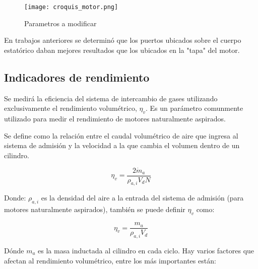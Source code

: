 
\begin{figure}
    \centering
    \texttt{[image: croquis\_motor.png]}
    \caption{Parametros a modificar}
    \label{fig:croquis_mrcvc}
\end{figure}

En trabajos anteriores \cite{chiquito} se determinó que los puertos ubicados
sobre el cuerpo estatórico daban mejores resultados que los ubicados en la
"tapa" del motor.

\subsection{Indicadores de rendimiento}
\label{sec:indicadores_rendimiento}

Se medirá la eficiencia del sistema de intercambio de gases utilizando
exclusivamente el rendimiento volumétrico, $\eta_v$.
%
Es un parámetro comunmente utilizado para medir el rendimiento de motores
naturalmente aspirados.

%
Se define como la relación entre el caudal volumétrico de aire que ingresa
al sistema de admisión y la velocidad a la que cambia el volumen dentro de un
cilindro.

\begin{equation}
  \label{eq:rendVol}
  \eta_v = \frac{2 \dot{m}_a}{\rho_{a,i} V_d N}
\end{equation}

Donde: $\rho_{a,i}$ es la densidad del aire a la entrada del sistema de
admisión (para motores naturalmente aspirados), también se puede definir
$\eta_v$ como:

\begin{equation}
    \label{eq:rendVol2}
    \eta_v = \frac{m_a}{\rho_{a,i} V_d}
\end{equation}

Dónde $m_a$ es la masa inductada al cilindro en cada ciclo.
%
Hay varios factores que afectan al rendimiento volumétrico, entre los más
importantes están:

